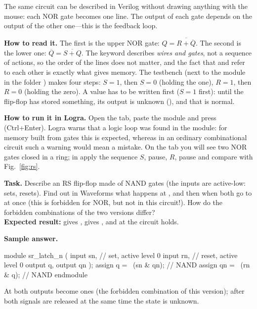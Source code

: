 The same circuit can be described in Verilog without drawing anything with the
mouse: each NOR gate becomes one  line. The output of each gate
depends on the output of the other one---this is the feedback loop.


\textbf{How to read it.} The first  is the upper NOR gate:
$Q=\overline{R+\overline{Q}}$. The second is the lower one:
$\overline{Q}=\overline{S+Q}$. The keyword  describes \emph{wires
and gates}, not a sequence of actions, so the order of the lines does not
matter, and the fact that  and  refer to each other is exactly
what gives memory. The testbench  (next to the module in
the folder ) makes four steps: $S=1$, then $S=0$
(holding the one), $R=1$, then $R=0$ (holding the zero). A value has to be
written first ($S=1$ first): until the flip-flop has stored something, its
output is unknown (), and that is normal.

\textbf{How to run it in Logra.} Open the  tab, paste the module and
press  (Ctrl+Enter). Logra warns that a logic loop was found
in the module: for memory built from gates this is expected, whereas in an
ordinary combinational circuit such a warning would mean a mistake. On the
 tab you will see two NOR gates closed in a ring; in 
apply the sequence $S$, pause, $R$, pause and compare with
Fig.~\ref{fig:rs}.

\begin{diybox}
\textbf{Task.}  Describe an RS flip-flop made of NAND gates (the inputs
are active-low:  sets,  resets).  Find out in
Waveforms what happens at , and then when both go to
 at once (this is forbidden for NOR, but not in this circuit!). How do
the forbidden combinations of the two versions differ?\\
\textbf{Expected result:}  gives ,  gives
, and at  the circuit holds.
\end{diybox}

\textbf{Sample answer.}
\begin{vcode}
module sr_latch_n (
    input  sn,       // set, active level 0
    input  rn,       // reset, active level 0
    output q,
    output qn
);
    assign q  = ~(sn & qn);   // NAND
    assign qn = ~(rn & q);    // NAND
endmodule
\end{vcode}
At  both outputs become ones (the forbidden combination of
this version); after both signals are released at the same time the state is
unknown.

